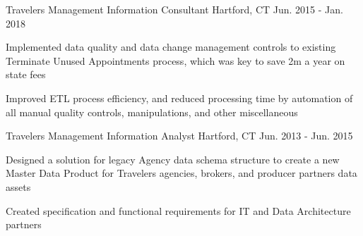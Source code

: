 \begin{cventries}
  \cventry
    {Travelers} %
    {Management Information Consultant} %
    {Hartford, CT} %
    {Jun. 2015 - Jan. 2018} %
    {
      \begin{cvitems} %
        \item {Implemented data quality and data change management controls to existing Terminate Unused Appointments 
        process, which was key to save 2m a year on state fees}
        \item {Improved ETL process efficiency, and reduced processing time by automation of all manual quality controls, 
        manipulations, and other miscellaneous}
      \end{cvitems}
    }

  \cventry
    {Travelers} %
    {Management Information Analyst} %
    {Hartford, CT} %
    {Jun. 2013 - Jun. 2015} %
    {
      \begin{cvitems} %
        \item {Designed a solution for legacy Agency data schema structure to create a new Master Data Product for 
        Travelers agencies, brokers, and producer partners data assets}
        \item {Created specification and functional requirements for IT and Data Architecture partners}
      \end{cvitems}
    }

\end{cventries}
